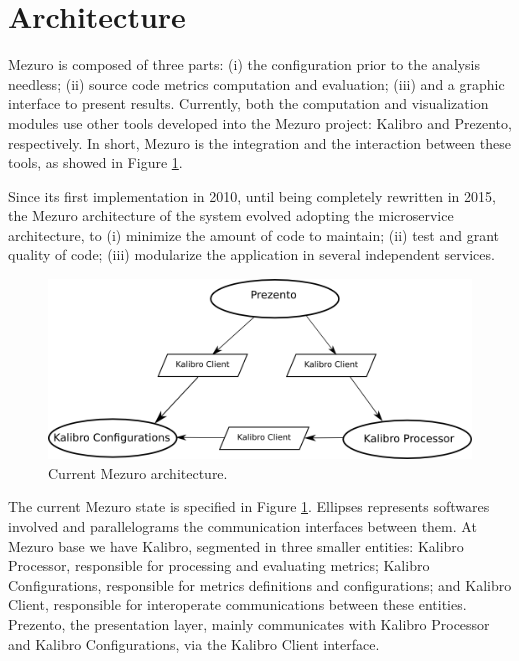 \section{Architecture}
\label{sec:architecture}

Mezuro is composed of three parts:
(i) the configuration prior to the analysis needless;
(ii) source code metrics computation and evaluation;
(iii) and a graphic interface to present results.
%
Currently, both the computation and visualization modules use other tools
developed into the Mezuro project: Kalibro and Prezento, respectively. In
short, Mezuro is the integration and the interaction between these tools, as
showed in Figure \ref{fig:architecture-2}.

Since its first implementation in 2010\cite{mezuro2012}, until being completely
rewritten in 2015, the Mezuro architecture of the system evolved adopting the
microservice architecture\cite{namiot2014micro}, to (i) minimize the amount of
code to maintain; (ii) test and grant quality of code; (iii) modularize the
application in several independent services.

\begin{figure}[hbt]
  \centering
    \includegraphics[width=.8\linewidth]{images/mezuro-architecturev3.png}
  \caption{Current Mezuro architecture.}
  \label{fig:architecture-2}
\end{figure}

The current Mezuro state is specified in Figure \ref{fig:architecture-2}.
Ellipses represents softwares involved and parallelograms the communication
interfaces between them. At Mezuro base we have Kalibro, segmented in three
smaller entities: Kalibro Processor, responsible for processing and evaluating
metrics; Kalibro Configurations, responsible for metrics definitions and
configurations; and Kalibro Client, responsible for interoperate communications
between these entities.  Prezento, the presentation layer, mainly communicates
with Kalibro Processor and Kalibro Configurations, via the Kalibro Client
interface.
